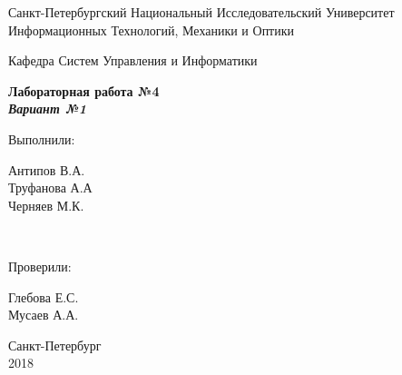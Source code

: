 \begin{titlepage}
  \begin{center}
    \vspace{2cm}
    Санкт-Петербургский Национальный Исследовательский Университет\\
    Информационных Технологий, Механики и Оптики

    \vspace{6cm}

    Кафедра Систем Управления и Информатики

    \vspace{3cm}
    \textbf{Лабораторная работа №4 \\ \textit{Вариант №1}}
  \end{center}
  \vspace{4cm}
  \hfill
  \parbox[top][3cm][t]{3cm}{Выполнили:}
  \parbox[top][3cm][t]{3cm}{
  Антипов В.А.\\
  Труфанова А.А\\
  Черняев М.К.}
  \\

  \hfill
  \parbox[right][3cm][t]{3cm}{Проверили:}
  \parbox[right][3cm][t]{3cm}{
  Глебова Е.С.\\
  Мусаев А.А.}

  \vfill
  \begin{center}
  Санкт-Петербург \\ 2018
  \end{center}
\end{titlepage}
